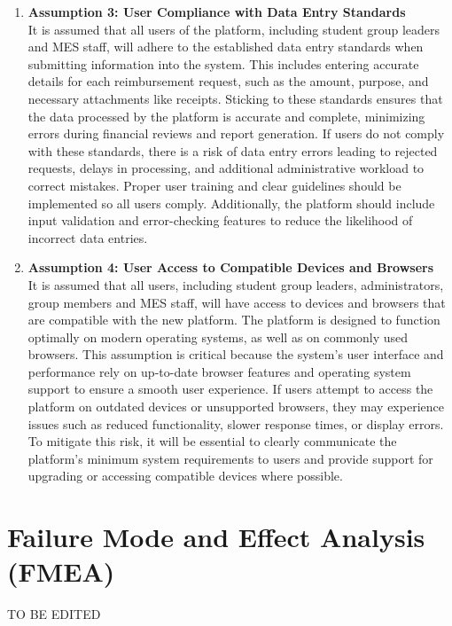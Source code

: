 \documentclass{article}
\begin{document}
\begin{enumerate}
    \item \textbf{Assumption 3: User Compliance with Data Entry Standards} \\
    It is assumed that all users of the platform, including student group leaders and MES staff, will adhere to the established data entry standards when submitting information into the system. This includes entering accurate details for each reimbursement request, such as the amount, purpose, and necessary attachments like receipts. Sticking to these standards ensures that the data processed by the platform is accurate and complete, minimizing errors during financial reviews and report generation. If users do not comply with these standards, there is a risk of data entry errors leading to rejected requests, delays in processing, and additional administrative workload to correct mistakes. Proper user training and clear guidelines should be implemented so all users comply. Additionally, the platform should include input validation and error-checking features to reduce the likelihood of incorrect data entries.

    \item \textbf{Assumption 4: User Access to Compatible Devices and Browsers} \\
    It is assumed that all users, including student group leaders, administrators, group members and MES staff, will have access to devices and browsers that are compatible with the new platform. The platform is designed to function optimally on modern operating systems, as well as on commonly used browsers. This assumption is critical because the system's user interface and performance rely on up-to-date browser features and operating system support to ensure a smooth user experience. If users attempt to access the platform on outdated devices or unsupported browsers, they may experience issues such as reduced functionality, slower response times, or display errors. To mitigate this risk, it will be essential to clearly communicate the platform’s minimum system requirements to users and provide support for upgrading or accessing compatible devices where possible.
    
\end{enumerate}



\section{Failure Mode and Effect Analysis (FMEA)}
TO BE EDITED
\end{document}
